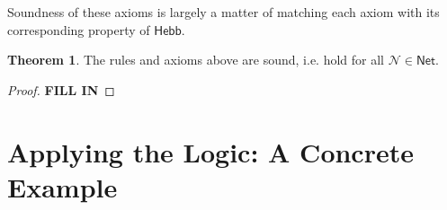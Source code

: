 \documentclass[letterpaper]{article}
\theoremstyle{definition}
\newtheorem{theorem}{Theorem}
\newtheorem{lemma}[theorem]{Lemma}
\newcommand{\semantics}[1]{[\![\mbox{\em $ #1 $\/}]\!]}
\newcommand{\Inc}{\textsf{Hebb}}
\newcommand{\AllNets}{\mathsf{Net}}
\newcommand{\Net}{\mathcal{N}}
\begin{document}

Soundness of these axioms is largely a matter of matching each axiom with its corresponding property of $\Inc$.

\begin{theorem}
The rules and axioms above are sound, i.e. hold for all $\Net \in \AllNets$.
\end{theorem}
\begin{proof}
\textbf{\textcolor{myred}{FILL IN}}
\end{proof}

\section{Applying the Logic: A Concrete Example}
\label{sec:concrete}
\end{document}
